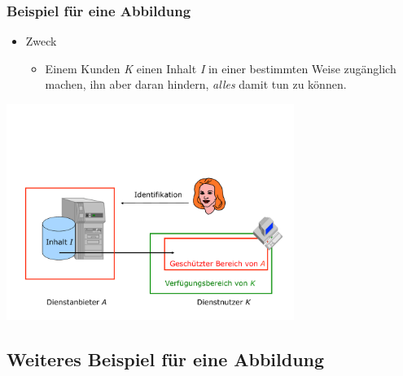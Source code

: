 \documentclass[t,aspectratio=169]{beamer}
\begin{document}
\begin{frame}
	\transwipe %
	\frametitle{Beispiel für eine Abbildung}
	\begin{itemize}
		\item Zweck
			\begin{itemize}
				\item Einem Kunden \emph{\color[RGB]{0,128,0} K} einen Inhalt \emph{\color{red} I} in einer bestimmten Weise zugänglich machen, ihn aber daran hindern, \emph{alles} damit tun zu können.
			\end{itemize}
	\end{itemize}
	\vspace{\fill}
	\begin{center}
		\includegraphics[width=0.7\textwidth]{../pic/abbildung2.pdf}
	\end{center}
\end{frame}

\subsection{Weiteres Beispiel für eine Abbildung} %
\end{document}
